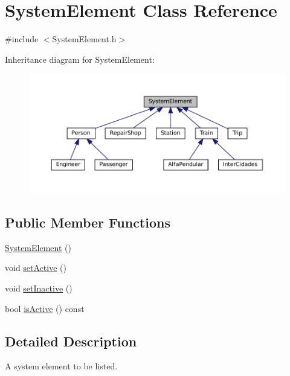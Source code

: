 \hypertarget{classSystemElement}{}\section{System\+Element Class Reference}
\label{classSystemElement}


{\ttfamily \#include $<$System\+Element.\+h$>$}



Inheritance diagram for System\+Element\+:
\nopagebreak
\begin{figure}[H]
\begin{center}
\leavevmode
\includegraphics[width=350pt]{classSystemElement__inherit__graph}
\end{center}
\end{figure}
\subsection*{Public Member Functions}
\begin{DoxyCompactItemize}
\item 
\mbox{\hyperlink{classSystemElement_a212b0b8d05fc08ae3358cbae576e3f39}{System\+Element}} ()
\item 
void \mbox{\hyperlink{classSystemElement_a020e7af72158df06021525b5bb878e92}{set\+Active}} ()
\item 
void \mbox{\hyperlink{classSystemElement_aaa601d0e2960dd62d68e0f025f5eb362}{set\+Inactive}} ()
\item 
bool \mbox{\hyperlink{classSystemElement_a50987a52734db127a8ff3574903182d0}{is\+Active}} () const
\end{DoxyCompactItemize}


\subsection{Detailed Description}
A system element to be listed. 

